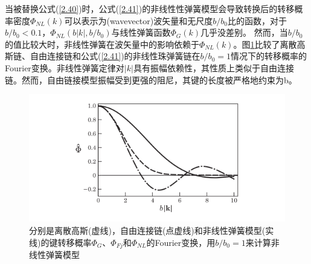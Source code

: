 当被替换公式(\ref{2.40})时，公式(\ref{2.41})的非线性性弹簧模型会导致转换后的转移概率密度$\varPhi_{NL}(k)$可以表示为(wavevector)波矢量和无尺度$b/b_{0}$比的函数，对于$b/b_{0}<0.1$，$\varPhi_{NL}(b|k|,b/b_{0})$与线性弹簧函数$\varPhi_{G}(k)$几乎没差别。 然而，当$b/b_{0}$的值比较大时，非线性弹簧在波矢量中的影响依赖于$\varPhi_{NL}(k)$。图\ref{figures24}比较了离散高斯链、自由连接链和公式(\ref{2.41})的非线性珠弹簧链在$b/b_{0}=1$情况下的转移概率的Fourier变换。非线性弹簧定律对$|k|$具有振幅依赖性，其性质上类似于自由连接链。然而，自由链接模型振幅受到更强的阻尼，其键的长度被严格地约束为b。
\begin{figure}[H]
\centering
\includegraphics[width=15cm]{./figures/24.png}
\caption{分别是离散高斯(虚线)，自由连接链(点虚线)和非线性弹簧模型(实线)的键转移概率$\varPhi_{G}$、$\varPhi_{Fj}$和$\varPhi_{NL}$的Fourier变换，用$b/b_{0}=1$来计算非线性弹簧模型}
\label{figures24}
\end{figure}

